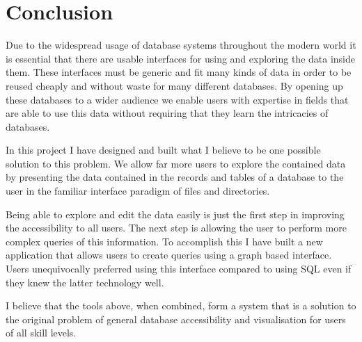 \chapter{Conclusion}

Due to the widespread usage of database systems throughout the modern world it
is essential that there are usable interfaces for using and exploring the data
inside them. These interfaces must be generic and fit many kinds of data in
order to be reused cheaply and without waste for many different databases. By
opening up these databases to a wider audience we enable users with expertise
in fields that are able to use this data without requiring that they learn the
intricacies of databases.

In this project I have designed and built what I believe to be one possible
solution to this problem. We allow far more users to explore the contained data
by presenting the data contained in the records and tables of a database to the
user in the familiar interface paradigm of files and directories.

Being able to explore and edit the data easily is just the first step in
improving the accessibility to all users. The next step is allowing the user to
perform more complex queries of this information. To accomplish this I have
built a new application that allows users to create queries using a graph based
interface. Users unequivocally preferred using this interface compared to using
\ac{SQL} even if they knew the latter technology well.

I believe that the tools above, when combined, form a system that is a solution
to the original problem of general database accessibility and visualisation for
users of all skill levels.
